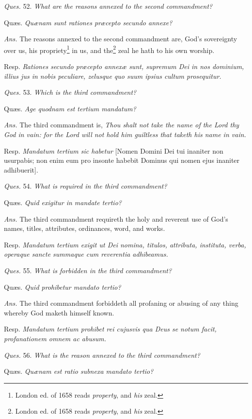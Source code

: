 \emph{Ques.} 52. \emph{What are the reasons annexed to the second commandment?}

Quæs. \emph{Quænam sunt rationes præcepto secundo annexe?}

\emph{Ans.} The reasons annexed to the second commandment are, God's sovereignty over us, his propriety\footnote{London ed. of 1658 reads \emph{property}, and \emph{his} zeal.} in us, and the\footnote{London ed. of 1658 reads \emph{property}, and \emph{his} zeal.} zeal he hath to his own worship.

Resp. \emph{Rationes secundo præcepto annexæ sunt, supremum Dei in nos dominium, illius jus in nobis peculiare, zelusque quo suum ipsius cultum prosequitur.}

\emph{Ques.} 53. \emph{Which is the third commandment?}

Quæs. \emph{Age quodnam est tertium mandatum?}

\emph{Ans.} The third commandment is, \emph{Thou shalt not take the name of the Lord thy God in vain: for the Lord will not hold him guiltless that taketh his name in vain.}

Resp. \emph{Mandatum tertium sic habetur} [Nomen Domini Dei tui inaniter non usurpabis; non enim eum pro insonte habebit Dominus qui nomen ejus inaniter adhibuerit].

\emph{Ques.} 54. \emph{What is required in the third commandment?}

Quæs. \emph{Quid exigitur in mandate tertio?}

\emph{Ans.} The third commandment requireth the holy and reverent use of God's names, titles, attributes, ordinances, word, and works.

Resp. \emph{Mandatum tertium exigit ut Dei nomina, titulos, attributa, instituta, verba, operaque sancte summaque cum reverentia adhibeamus.}

\emph{Ques.} 55. \emph{What is forbidden in the third commandment?}

Quæs. \emph{Quid prohibetur mandato tertio?}

\emph{Ans.} The third commandment forbiddeth all profaning or abusing of any thing whereby God maketh himself known.

Resp. \emph{Mandatum tertium prohibet rei cujusvis qua Deus se notum facit, profanationem omnem ac abusum.}

\emph{Ques.} 56. \emph{What is the reason annexed to the third commandment?}

Quæs. \emph{Quænam est ratio subnexa mandato tertio?}

